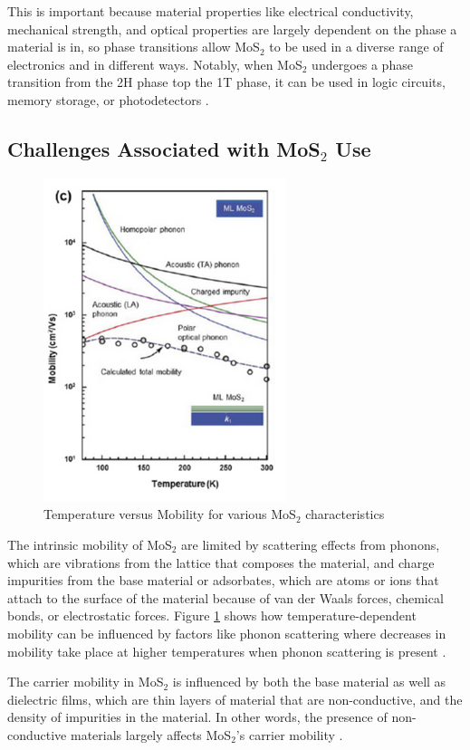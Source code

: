 \documentclass[conference]{IEEEtran}
\begin{document}
This is important because material properties like electrical conductivity, mechanical strength, and optical properties are largely dependent on the phase a material is in, so phase transitions allow MoS$_2$ to be used in a diverse range of electronics and in different ways. Notably, when MoS$_2$ undergoes a phase transition from the 2H phase top the 1T phase, it can be used in logic circuits, memory storage, or photodetectors \cite{oa4}.

\subsection{Challenges Associated with MoS$_2$ Use}

\begin{figure}[h]
  \centering
  \includegraphics[width=.5\textwidth]{Figures/MOS2}
  \caption{Temperature versus Mobility for various MoS$_2$ characteristics \cite{oa5}}
  \label{fig:3}
\end{figure}

The intrinsic mobility of MoS$_2$ are limited by scattering effects from phonons, which are vibrations from the lattice that composes the material, and charge impurities from the base material or adsorbates, which are atoms or ions that attach to the surface of the material because of van der Waals forces, chemical bonds, or electrostatic forces. Figure \ref{fig:3} shows how temperature-dependent mobility can be influenced by factors like phonon scattering where decreases in mobility take place at higher temperatures when phonon scattering is present \cite{oa5}.

The carrier mobility in MoS$_2$ is influenced by both the base material as well as dielectric films, which are thin layers of material that are non-conductive, and the density of impurities in the material. In other words, the presence of non-conductive materials largely affects MoS$_2$'s carrier mobility \cite{oa6}.
\end{document}
